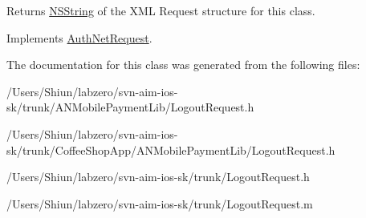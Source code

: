 \begin{DoxyReturn}{Returns}
\hyperlink{class_n_s_string}{NSString} of the XML Request structure for this class. 
\end{DoxyReturn}


Implements \hyperlink{interface_auth_net_request_aab99d065f49b7ed086b041c1c70e2975}{AuthNetRequest}.



The documentation for this class was generated from the following files:\begin{DoxyCompactItemize}
\item 
/Users/Shiun/labzero/svn-\/aim-\/ios-\/sk/trunk/ANMobilePaymentLib/LogoutRequest.h\item 
/Users/Shiun/labzero/svn-\/aim-\/ios-\/sk/trunk/CoffeeShopApp/ANMobilePaymentLib/LogoutRequest.h\item 
/Users/Shiun/labzero/svn-\/aim-\/ios-\/sk/trunk/LogoutRequest.h\item 
/Users/Shiun/labzero/svn-\/aim-\/ios-\/sk/trunk/LogoutRequest.m\end{DoxyCompactItemize}
